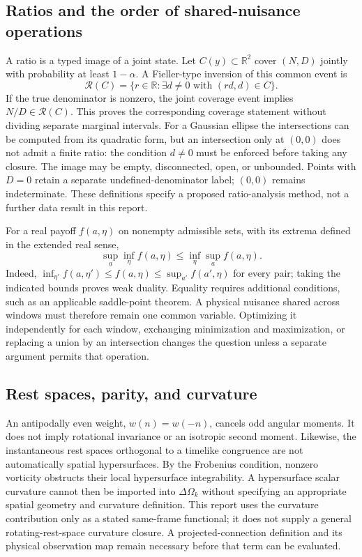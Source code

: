 \subsection{Ratios and the order of shared-nuisance operations}

A ratio is a typed image of a joint state. Let $C(y)\subset\mathbb R^2$ cover $(N,D)$ jointly with probability at least $1-\alpha$. A Fieller-type inversion of this common event is
\begin{equation}
 \mathcal R(C)=\{r\in\mathbb R:\exists d\ne0\text{ with }(rd,d)\in C\}.
\end{equation}
If the true denominator is nonzero, the joint coverage event implies $N/D\in\mathcal R(C)$. This proves the corresponding coverage statement without dividing separate marginal intervals. For a Gaussian ellipse the intersections can be computed from its quadratic form, but an intersection only at $(0,0)$ does not admit a finite ratio: the condition $d\ne0$ must be enforced before taking any closure. The image may be empty, disconnected, open, or unbounded. Points with $D=0$ retain a separate undefined-denominator label; $(0,0)$ remains indeterminate. These definitions specify a proposed ratio-analysis method, not a further data result in this report.

For a real payoff $f(a,\eta)$ on nonempty admissible sets, with its extrema defined in the extended real sense,
\begin{equation}
 \sup_a\inf_\eta f(a,\eta)\leq\inf_\eta\sup_a f(a,\eta).
\end{equation}
Indeed, $\inf_{\eta'}f(a,\eta')\leq f(a,\eta)\leq\sup_{a'}f(a',\eta)$ for every pair; taking the indicated bounds proves weak duality. Equality requires additional conditions, such as an applicable saddle-point theorem. A physical nuisance shared across windows must therefore remain one common variable. Optimizing it independently for each window, exchanging minimization and maximization, or replacing a union by an intersection changes the question unless a separate argument permits that operation.

\subsection{Rest spaces, parity, and curvature}

An antipodally even weight, $w(n)=w(-n)$, cancels odd angular moments. It does not imply rotational invariance or an isotropic second moment. Likewise, the instantaneous rest spaces orthogonal to a timelike congruence are not automatically spatial hypersurfaces. By the Frobenius condition, nonzero vorticity obstructs their local hypersurface integrability. A hypersurface scalar curvature cannot then be imported into $\Delta\Omega_k$ without specifying an appropriate spatial geometry and curvature definition. This report uses the curvature contribution only as a stated same-frame functional; it does not supply a general rotating-rest-space curvature closure. A projected-connection definition and its physical observation map remain necessary before that term can be evaluated.

